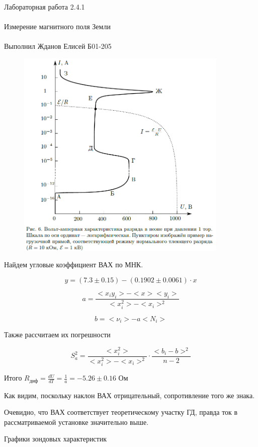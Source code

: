 \documentclass{astroedu-lab}
\begin{document}
\begin{problem}{\huge Лабораторная работа 2.4.1\\\\Измерение магнитного поля Земли\\\\Выполнил Жданов Елисей Б01-205}
\begin{figure}[!h]
	\centering
	\includegraphics[width=0.9\textwidth]{th1.png}
	\label{fig:boiler}
\end{figure}

\newpage

Найдем угловые коэффициент ВАХ по МНК.

\begin{equation}
	y = (7.3 \pm 0.15) - (0.1902 \pm 0.0061) \cdot x
\end{equation}

\[
	a = \frac{<x_i y_i> - < x > < y_i >}{< x_i^2> - < x_i >^2}
\]

\[
	b = < \nu_i > - a < N_i >
\]

Также рассчитаем их погрешности

\begin{equation}
	S_a^2 = \frac{< x_i^2>}{< x_i^2 > - < x_i >^2} \cdot \frac{<  b_i - b > ^2}{n - 2}
\end{equation}

Итого $R_\text{диф} = \frac{dU}{dI} = \frac{1}{a} = -5.26 \pm 0.16 \text{ Ом}$

Как видим, поскольку наклон ВАХ отрицательный, сопротивление того же знака.

Очевидно, что ВАХ соответствует теоретическому участку ГД, правда ток в рассматриваемой установке значительно выше.

Графики зондовых характеристик



\end{problem}
\end{document}
